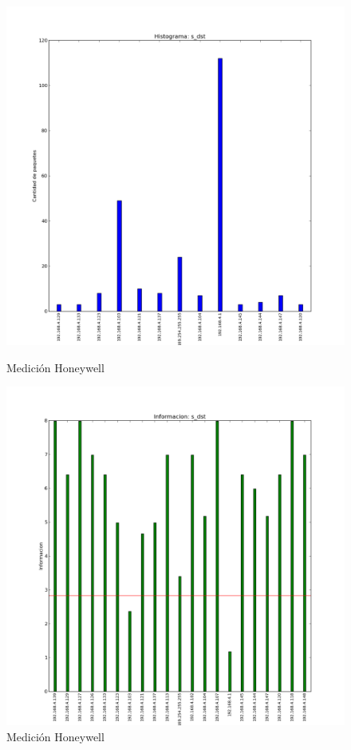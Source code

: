 \documentclass[10pt, a4paper]{article}
\begin{document}
\begin{figure}[H]
   \begin{minipage}{0.5\linewidth}
     \includegraphics[width=\linewidth]{../imgs/prueba_laburo-ips_s_dst_hist.png}
     \caption{Medición Honeywell}\label{fig:Honeywell-dst-hist}
   \end{minipage}
  \hfill
   \begin{minipage}{0.5\linewidth}
     \includegraphics[width=\linewidth]{../imgs/prueba_laburo-ips_s_dst_info.png}
     \caption{Medición Honeywell}\label{fig:Honeywell-dst-info}
   \end{minipage}
 \end{figure}
\end{document}
